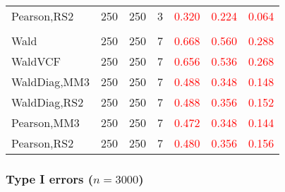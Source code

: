 \documentclass[
]{article}
\begin{document}
\begin{table}[H]
{\begin{tabular}[t]{lrrrrrr}
\hspace{1em}Pearson,RS2 & 250 & 250 & 3 & \textcolor{red}{0.320} & \textcolor{red}{0.224} & \textcolor{red}{0.064}\\
\addlinespace[0.3em]
\multicolumn{7}{l}{\textbf{3F 15V}}\\
\hspace{1em}Wald & 250 & 250 & 7 & \textcolor{red}{0.668} & \textcolor{red}{0.560} & \textcolor{red}{0.288}\\
\hspace{1em}WaldVCF & 250 & 250 & 7 & \textcolor{red}{0.656} & \textcolor{red}{0.536} & \textcolor{red}{0.268}\\
\hspace{1em}WaldDiag,MM3 & 250 & 250 & 7 & \textcolor{red}{0.488} & \textcolor{red}{0.348} & \textcolor{red}{0.148}\\
\hspace{1em}WaldDiag,RS2 & 250 & 250 & 7 & \textcolor{red}{0.488} & \textcolor{red}{0.356} & \textcolor{red}{0.152}\\
\hspace{1em}Pearson,MM3 & 250 & 250 & 7 & \textcolor{red}{0.472} & \textcolor{red}{0.348} & \textcolor{red}{0.144}\\
\hspace{1em}Pearson,RS2 & 250 & 250 & 7 & \textcolor{red}{0.480} & \textcolor{red}{0.356} & \textcolor{red}{0.156}\\
\bottomrule
\end{tabular}}
\endgroup{}
\end{table}

\hypertarget{type-i-errors-n3000-1}{%
\subsubsection{\texorpdfstring{Type I errors
(\(n=3000\))}{Type I errors (n=3000)}}\label{type-i-errors-n3000-1}}
\end{document}
